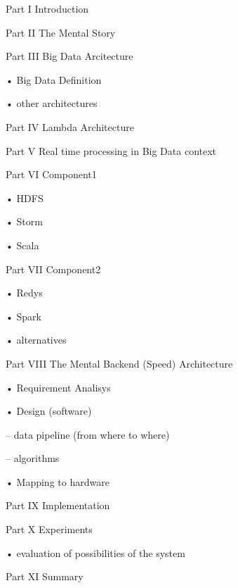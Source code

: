 Part I Introduction

Part II The Mental Story

Part III Big Data Arcitecture

• Big Data Definition

• other architectures

Part IV Lambda Architecture

Part V Real time processing in Big Data context

Part VI Component1

• HDFS

• Storm

• Scala

Part VII Component2

• Redys

• Spark

• alternatives

Part VIII The Mental Backend (Speed) Architecture

• Requirement Analisys

• Design (software)

– data pipeline (from where to where)

– algorithms

• Mapping to hardware

Part IX Implementation

Part X Experiments

• evaluation of possibilities of the system

Part XI Summary